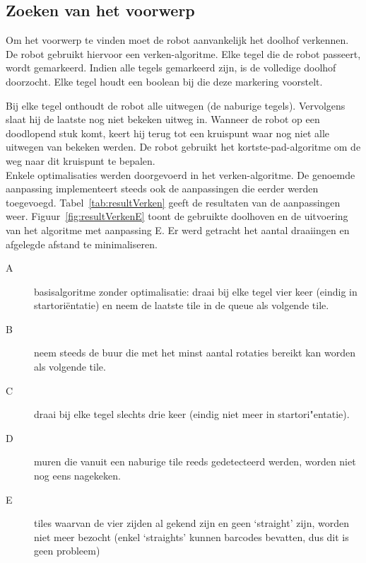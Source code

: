 \documentclass[tt1]{penoverslag}
\begin{document}
\subsection{Zoeken van het voorwerp} %
\label{ssec:algoZoek}
Om het voorwerp te vinden moet de robot aanvankelijk het doolhof verkennen. De robot gebruikt hiervoor een verken-algoritme. Elke tegel die de robot passeert, wordt gemarkeerd. Indien alle tegels gemarkeerd zijn, is de volledige doolhof doorzocht. Elke tegel houdt een boolean bij die deze markering voorstelt.

Bij elke tegel onthoudt de robot alle uitwegen (de naburige tegels). Vervolgens slaat hij de laatste nog niet bekeken uitweg in. Wanneer de robot op een doodlopend stuk komt, keert hij terug tot een kruispunt waar nog niet alle uitwegen van bekeken werden. De robot gebruikt het kortste-pad-algoritme om de weg naar dit kruispunt te bepalen.\\

Enkele optimalisaties werden doorgevoerd in het verken-algoritme. De genoemde aanpassing implementeert steeds ook de aanpassingen die eerder werden toegevoegd. Tabel~\ref{tab:resultVerken} geeft de resultaten van de aanpassingen weer. Figuur~\ref{fig:resultVerkenE} toont de gebruikte doolhoven en de uitvoering van het algoritme met aanpassing E. Er werd getracht het aantal draaiingen en afgelegde afstand te minimaliseren.

\begin{description}
\item[A] basisalgoritme zonder optimalisatie: draai bij elke tegel vier keer (eindig in startori\"entatie) en neem de laatste tile in de queue als volgende tile.
\item[B] neem steeds de buur die met het minst aantal rotaties bereikt kan worden als volgende tile.
\item[C] draai bij elke tegel slechts drie keer (eindig niet meer in startori"entatie).
\item[D] muren die vanuit een naburige tile reeds gedetecteerd werden, worden niet nog eens nagekeken.
\item[E] tiles waarvan de vier zijden al gekend zijn en geen `straight' zijn, worden niet meer bezocht (enkel `straights' kunnen barcodes bevatten, dus dit is geen probleem)
\end{description}
\end{document}
